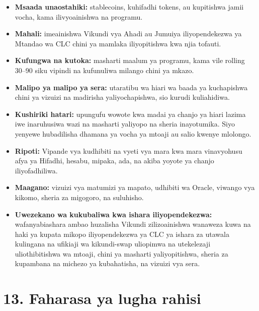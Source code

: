 \documentclass[11pt]{article}
\begin{document}
\begin{itemize}[leftmargin=*]
\item \textbf{Msaada unaostahiki:} stablecoins, kuhifadhi tokens, au kupitishwa jamii vocha, kama ilivyoainishwa na programu.
\item \textbf{Mahali:} imeainishwa Vikundi vya Ahadi au Jumuiya iliyopendekezwa ya Mtandao wa CLC chini ya mamlaka iliyopitishwa kwa njia tofauti.
\item \textbf{Kufungwa na kutoka:} masharti maalum ya programu, kama vile rolling 30--90 siku vipindi na kufunuliwa milango chini ya mkazo.
\item \textbf{Malipo ya malipo ya sera:} utaratibu wa hiari wa baada ya kuchapishwa chini ya vizuizi na madirisha yaliyochapishwa, sio kurudi kuliahidiwa.
\item \textbf{Kushiriki hatari:} upungufu wowote kwa madai ya chanjo ya hiari lazima iwe inaruhusiwa wazi na masharti yaliyopo na sheria inayotumika. Siyo yenyewe hubadilisha dhamana ya vocha ya mtoaji au salio kwenye mlolongo.
\item \textbf{Ripoti:} Vipande vya kudhibiti na vyeti vya mara kwa mara vinavyohusu afya ya Hifadhi, hesabu, mipaka, ada, na akiba yoyote ya chanjo iliyofadhiliwa.
\item \textbf{Maagano:} vizuizi vya matumizi ya mapato, udhibiti wa Oracle, viwango vya kikomo, sheria za migogoro, na suluhisho.
\item \textbf{Uwezekano wa kukubaliwa kwa ishara iliyopendekezwa:} wafanyabiashara ambao huzalisha Vikundi zilizoainishwa wanaweza kuwa na haki ya kupata mikopo iliyopendekezwa ya CLC ya ishara za utawala kulingana na ufikiaji wa kikundi-swap uliopimwa na utekelezaji uliothibitishwa wa mtoaji, chini ya masharti yaliyopitishwa, sheria za kupambana na michezo ya kubahatisha, na vizuizi vya sera.
\end{itemize}


\section*{13. Faharasa ya lugha rahisi}
\end{document}
